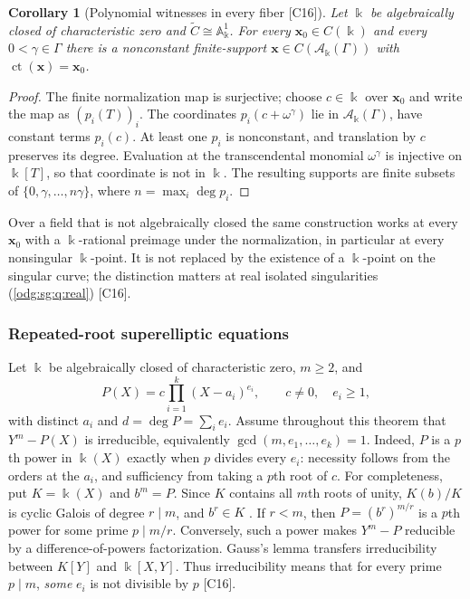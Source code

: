 \documentclass[11pt,oneside]{article}
\numberwithin{equation}{section}
\newtheorem{corollary}[corollary]{Corollary}
\theoremstyle{definition}
\theoremstyle{remark}
\newcommand{\ct}{\operatorname{ct}}
\newcommand{\src}[1]{\textup{\textsf{\small[#1]}}}
\newcommand{\crA}{\mathcal A_\Bbbk(\Gamma)}
\newcommand{\Aff}{\mathbb A}
\begin{document}
\begin{corollary}[Polynomial witnesses in every fiber \src{C16}]\label{odg:sg:cor:fibre}
Let $\Bbbk$ be algebraically closed of characteristic zero and $\widetilde C\cong\Aff^1_\Bbbk$.
For every $\mathbf x_0\in C(\Bbbk)$ and every $0<\gamma\in\Gamma$ there is a nonconstant
finite-support $\mathbf x\in C(\crA)$ with $\ct(\mathbf x)=\mathbf x_0$.
\end{corollary}
\begin{proof}
The finite normalization map is surjective; choose $c\in\Bbbk$ over $\mathbf x_0$ and write
the map as $(p_i(T))_i$. The coordinates $p_i(c+\omega^\gamma)$ lie in $\crA$, have constant
terms $p_i(c)$. At least one $p_i$ is nonconstant, and translation by $c$
preserves its degree. Evaluation at the transcendental monomial
$\omega^\gamma$ is injective on $\Bbbk[T]$, so that coordinate is not
in $\Bbbk$. The resulting supports are finite subsets of
$\{0,\gamma,\ldots,n\gamma\}$, where $n=\max_i\deg p_i$.
\end{proof}

Over a field that is not algebraically closed the same construction works at every
$\mathbf x_0$ with a $\Bbbk$-rational preimage under the normalization, in particular at
every nonsingular $\Bbbk$-point. It is not replaced by the existence of a $\Bbbk$-point on
the singular curve; the distinction matters at real isolated singularities
(\cref{odg:sg:q:real}) \src{C16}.

\subsubsection{Repeated-root superelliptic equations}\label{odg:sg:sub:super}

Let $\Bbbk$ be algebraically closed of characteristic zero, $m\ge2$, and
\begin{equation}\label{odg:sg:eq:superpoly}
 P(X)=c\prod_{i=1}^{k}(X-a_i)^{e_i},\qquad c\ne0,\quad e_i\ge1,
\end{equation}
with distinct $a_i$ and $d=\deg P=\sum_ie_i$. Assume throughout this theorem that
$Y^m-P(X)$ is irreducible, equivalently $\gcd(m,e_1,\ldots,e_k)=1$.
Indeed, $P$ is a $p$th power in $\Bbbk(X)$ exactly when $p$ divides every $e_i$:
necessity follows from the orders at the $a_i$, and sufficiency from taking a
$p$th root of $c$. For completeness, put $K=\Bbbk(X)$ and $b^m=P$.
Since $K$ contains all $m$th roots of unity, $K(b)/K$ is cyclic Galois of degree
$r\mid m$, and $b^r\in K$ \cite{StacksKummer}. If $r<m$, then
$P=(b^r)^{m/r}$ is a $p$th power for some prime $p\mid m/r$.
Conversely, such a power makes $Y^m-P$ reducible by a difference-of-powers
factorization. Gauss's lemma transfers irreducibility between $K[Y]$ and
$\Bbbk[X,Y]$. Thus irreducibility means that for every prime $p\mid m$,
\emph{some} $e_i$ is not divisible by $p$ \src{C16}.
\end{document}

